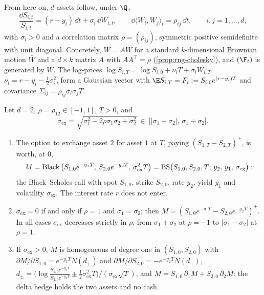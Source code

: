 From here on, $d$ assets follow, under $\Q$,
\begin{equation}\label{eq:ma-model}
  \frac{\dd S_{i,t}}{S_{i,t}}=(r-y_i)\,\dd t+\sigma_i\,\dd W_{i,t},\qquad
  \dd\langle W_i,W_j\rangle_t=\rho_{ij}\,\dd t,\qquad i,j=1,\dots,d,
\end{equation}
with $\sigma_i>0$ and a correlation matrix $\rho=(\rho_{ij})$, symmetric positive semidefinite with
unit diagonal. Concretely, $W=A\bar W$ for a standard $k$-dimensional Brownian motion $\bar W$ and
a $d\times k$ matrix $A$ with $AA^\top=\rho$ (\cref{prop:rng-cholesky}), and $(\F_t)$ is generated by $\bar W$. The log-prices
$\log S_{i,T}=\log S_{i,0}+\nu_iT+\sigma_iW_{i,T}$, $\nu_i=r-y_i-\frac12\sigma_i^2$, form a Gaussian
vector with $\E S_{i,T}=F_i:=S_{i,0}e^{(r-y_i)T}$ and covariance
$\Sigma_{ij}=\rho_{ij}\sigma_i\sigma_jT$.

\begin{theorem}\label{thm:ma-margrabe}
Let $d=2$, $\rho=\rho_{12}\in[-1,1]$, $T>0$, and
\[
  \sigma_{\mathrm{ex}}=\sqrt{\sigma_1^2-2\rho\sigma_1\sigma_2+\sigma_2^2}\ \in\ \big[|\sigma_1-\sigma_2|,\,\sigma_1+\sigma_2\big].
\]
\begin{enumerate}[label=(\roman*)]
  \item The option to exchange asset $2$ for asset $1$ at $T$, paying $(S_{1,T}-S_{2,T})^+$, is
    worth, at $0$,
    \[
      M=\operatorname{Black}\big(S_{1,0}e^{-y_1T},\,S_{2,0}e^{-y_2T},\,\sigma_{\mathrm{ex}}^2T\big)
      =\mathrm{BS}\big(S_{1,0},S_{2,0},T;\,y_2,\,y_1,\,\sigma_{\mathrm{ex}}\big):
    \]
    the Black--Scholes call with spot $S_{1,0}$, strike $S_{2,0}$, rate $y_2$, yield $y_1$ and
    volatility $\sigma_{\mathrm{ex}}$. The interest rate $r$ does not enter.
  \item $\sigma_{\mathrm{ex}}=0$ if and only if $\rho=1$ and $\sigma_1=\sigma_2$; then
    $M=(S_{1,0}e^{-y_1T}-S_{2,0}e^{-y_2T})^+$. In all cases $\sigma_{\mathrm{ex}}$ decreases
    strictly in $\rho$, from $\sigma_1+\sigma_2$ at $\rho=-1$ to $|\sigma_1-\sigma_2|$ at $\rho=1$.
  \item If $\sigma_{\mathrm{ex}}>0$, $M$ is homogeneous of degree one in $(S_{1,0},S_{2,0})$ with
    $\partial M/\partial S_{1,0}=e^{-y_1T}N(d_+)$ and $\partial M/\partial S_{2,0}=-e^{-y_2T}N(d_-)$,
    $d_\pm=\big(\log\frac{S_{1,0}e^{-y_1T}}{S_{2,0}e^{-y_2T}}\pm\frac12\sigma_{\mathrm{ex}}^2T\big)/(\sigma_{\mathrm{ex}}\sqrt T)$,
    and $M=S_{1,0}\,\partial_1M+S_{2,0}\,\partial_2M$: the delta hedge holds the two assets and no cash.
\end{enumerate}
\end{theorem}

